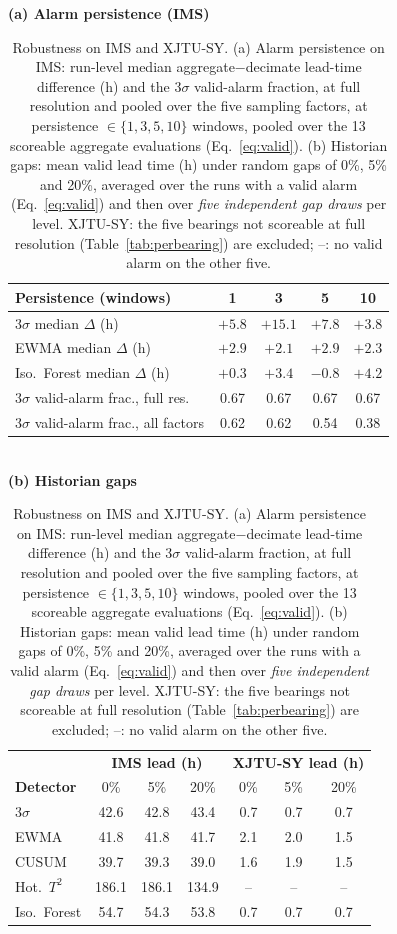 \documentclass[IJPHM, 2026, 0]{PHMSociety}
\begin{document}
\begin{table}[t] \small
	\setlength{\tabcolsep}{4pt}
	\begin{center}
	\caption{Robustness on IMS and XJTU-SY. (a) Alarm persistence on IMS: run-level median aggregate$-$decimate lead-time difference (h) and the $3\sigma$ valid-alarm fraction, at full resolution and pooled over the five sampling factors, at persistence $\in \{1,3,5,10\}$ windows, pooled over the 13 scoreable aggregate evaluations (Eq.~\ref{eq:valid}). (b) Historian gaps: mean valid lead time (h) under random gaps of 0\%, 5\% and 20\%, averaged over the runs with a valid alarm (Eq.~\ref{eq:valid}) and then over \emph{five independent gap draws} per level. XJTU-SY: the five bearings not scoreable at full resolution (Table~\ref{tab:perbearing}) are excluded; --: no valid alarm on the other five.}
	\label{tab:robust}
	\textbf{(a) Alarm persistence (IMS)}\\[2pt]
	\begin{tabular}{l c c c c}
		\hline \hline
		\textbf{Persistence (windows)} & \textbf{1} & \textbf{3} & \textbf{5} & \textbf{10} \\
		\hline
		$3\sigma$ median $\Delta$ (h) & $+5.8$ & $+15.1$ & $+7.8$ & $+3.8$ \\
		EWMA median $\Delta$ (h) & $+2.9$ & $+2.1$ & $+2.9$ & $+2.3$ \\
		Iso.\ Forest median $\Delta$ (h) & $+0.3$ & $+3.4$ & $-0.8$ & $+4.2$ \\
		$3\sigma$ valid-alarm frac., full res. & 0.67 & 0.67 & 0.67 & 0.67 \\
		$3\sigma$ valid-alarm frac., all factors & 0.62 & 0.62 & 0.54 & 0.38 \\
		\hline \hline
	\end{tabular}
	\\[6pt]\textbf{(b) Historian gaps}\\[2pt]
	\begin{tabular}{l c c c | c c c}
		\hline \hline
		 & \multicolumn{3}{c|}{\textbf{IMS lead (h)}} & \multicolumn{3}{c}{\textbf{XJTU-SY lead (h)}} \\
		\textbf{Detector} & 0\% & 5\% & 20\% & 0\% & 5\% & 20\% \\
		\hline
		$3\sigma$ & 42.6 & 42.8 & 43.4 & 0.7 & 0.7 & 0.7 \\
		EWMA & 41.8 & 41.8 & 41.7 & 2.1 & 2.0 & 1.5 \\
		CUSUM & 39.7 & 39.3 & 39.0 & 1.6 & 1.9 & 1.5 \\
		Hot.\ $T^2$ & 186.1 & 186.1 & 134.9 & -- & -- & -- \\
		Iso.\ Forest & 54.7 & 54.3 & 53.8 & 0.7 & 0.7 & 0.7 \\
		\hline \hline
	\end{tabular}
	\end{center}
\end{table}
\end{document}
